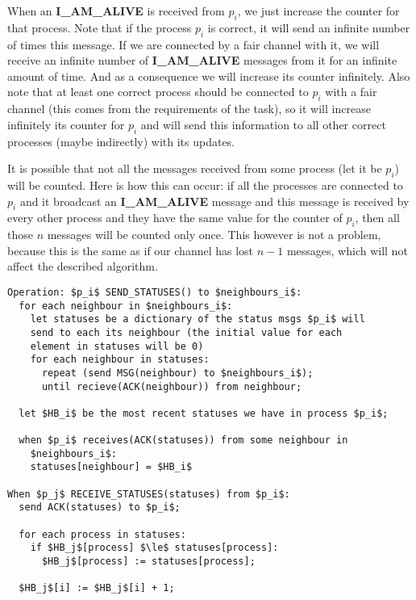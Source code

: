 \documentclass[12pt]{article}
\theoremstyle{plain}
\begin{document}
\begin{itemize}
    When an \textbf{I\_AM\_ALIVE} is received from $p_i$, we just increase the
    counter for that process. Note that if the process $p_i$ is correct, 
    it will send an infinite number of times this message. If we are connected
    by a fair channel with it, we will receive an infinite number of
    \textbf{I\_AM\_ALIVE} messages from it for an infinite amount of time.
    And as a consequence we will increase its counter infinitely. Also note that
    at least one correct process should be connected to $p_i$ with a fair
    channel (this comes from the requirements of the task), so it will increase
    infinitely its counter for $p_i$ and will send this information to all other
    correct processes (maybe indirectly) with its updates.

    It is possible that not all the messages received from some process (let it
    be $p_i$) will be counted. Here is how this can occur: if all the processes
    are connected to $p_i$ and it broadcast an \textbf{I\_AM\_ALIVE} message
    and this message is received by every other process and they have the same
    value for the counter of $p_i$, then all those $n$ messages will be counted
    only once. This however is not a problem, because this is the same as if
    our channel has lost $n - 1$ messages, which will not affect the described
    algorithm.
\end{itemize}

\begin{lstlisting}[frame=single]
Operation: $p_i$ SEND_STATUSES() to $neighbours_i$:
  for each neighbour in $neighbours_i$:
    let statuses be a dictionary of the status msgs $p_i$ will
    send to each its neighbour (the initial value for each
    element in statuses will be 0)
    for each neighbour in statuses:
      repeat (send MSG(neighbour) to $neighbours_i$);
      until recieve(ACK(neighbour)) from neighbour;

  let $HB_i$ be the most recent statuses we have in process $p_i$;

  when $p_i$ receives(ACK(statuses)) from some neighbour in
    $neighbours_i$:
    statuses[neighbour] = $HB_i$

When $p_j$ RECEIVE_STATUSES(statuses) from $p_i$:
  send ACK(statuses) to $p_i$;

  for each process in statuses:
    if $HB_j$[process] $\le$ statuses[process]:
      $HB_j$[process] := statuses[process];

  $HB_j$[i] := $HB_j$[i] + 1;
  
\end{lstlisting}
  
  
\end{document}
